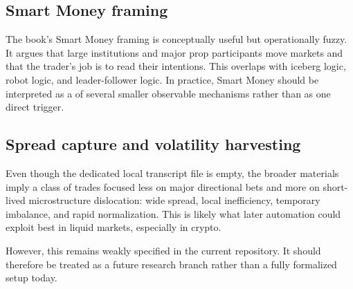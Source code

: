 \subsection{Smart Money framing}

The book's Smart Money framing is conceptually useful but operationally fuzzy. It argues that
large institutions and major prop participants move markets and that the trader's job is to read
their intentions. This overlaps with iceberg logic, robot logic, and leader-follower logic. In
practice, Smart Money should be interpreted as a  of several smaller
observable mechanisms rather than as one direct trigger.

\subsection{Spread capture and volatility harvesting}

Even though the dedicated local transcript file is empty, the broader materials imply a class of
trades focused less on major directional bets and more on short-lived microstructure dislocation:
wide spread, local inefficiency, temporary imbalance, and rapid normalization. This is likely
what later automation could exploit best in liquid markets, especially in crypto.

However, this remains weakly specified in the current repository. It should therefore be treated
as a future research branch rather than a fully formalized setup today.
